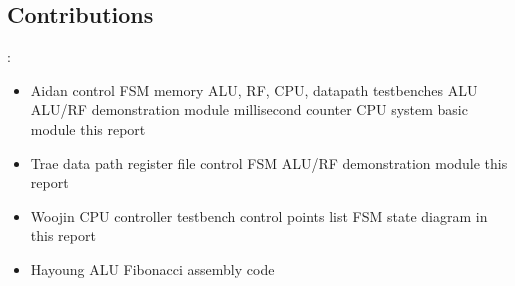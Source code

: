 \documentclass[10pt, portrait, letterpaper]{article}
\begin{document}
  \subsection{Contributions}: 
  \begin{itemize} 
    \item Aidan 
      \subitem control FSM 
      \subitem memory 
      \subitem ALU, RF, CPU, datapath testbenches
      \subitem ALU 
      \subitem ALU/RF demonstration module
      \subitem millisecond counter 
      \subitem CPU system basic module
      \subitem this report
    \item Trae
      \subitem data path 
      \subitem register file 
      \subitem control FSM
      \subitem ALU/RF demonstration module
      \subitem this report
    \item Woojin 
      \subitem CPU controller testbench 
      \subitem control points list 
      \subitem FSM state diagram in this report
    \item Hayoung
      \subitem ALU 
      \subitem Fibonacci assembly code
  \end{itemize}
\end{document}
